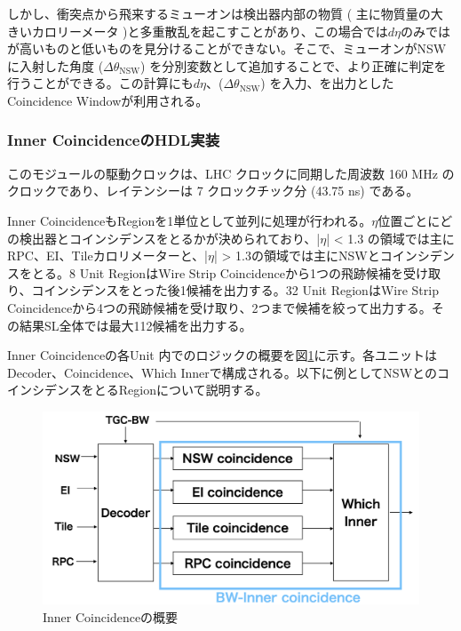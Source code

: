 しかし、衝突点から飛来するミューオンは検出器内部の物質 ( 主に物質量の大きいカロリーメータ )と多重散乱を起こすことがあり、この場合では$d\eta$のみでは\pt が高いものと低いものを見分けることができない。そこで、ミューオンがNSWに入射した角度 ($\Delta\theta_{\mathrm{NSW}}$) を分別変数として追加することで、より正確に\pt 判定を行うことができる。この計算にも$d\eta$、($\Delta\theta_{\mathrm{NSW}}$) を入力、\pt を出力としたCoincidence Windowが利用される。

\subsubsection*{Inner CoincidenceのHDL実装}
このモジュールの駆動クロックは、LHC クロックに同期した周波数 160 MHz のクロックであり、レイテンシーは 7 クロックチック分 (43.75 ns) である。

Inner CoincidenceもRegionを1単位として並列に処理が行われる。$\eta$位置ごとにどの検出器とコインシデンスをとるかが決められており、|$\eta$| < 1.3 の領域では主にRPC、EI、Tileカロリメーターと、|$\eta$| > 1.3の領域では主にNSWとコインシデンスをとる。8 Unit RegionはWire Strip Coincidenceから1つの飛跡候補を受け取り、コインシデンスをとった後1候補を出力する。32 Unit RegionはWire Strip Coincidenceから4つの飛跡候補を受け取り、2つまで候補を絞って出力する。その結果SL全体では最大112候補を出力する。

Inner Coincidenceの各Unit 内でのロジックの概要を図\ref{Inner_logic}に示す。各ユニットはDecoder、Coincidence、Which Innerで構成される。以下に例としてNSWとのコインシデンスをとるRegionについて説明する。

\begin{figure} 
\centering
\includegraphics[width=16cm]{fig/SL/Inner_integrate.png}
\caption[Inner Coincidenceの概要]{Inner Coincidenceの概要\cite{mt_kobayashi}}
\label{Inner_logic}
\end{figure}

